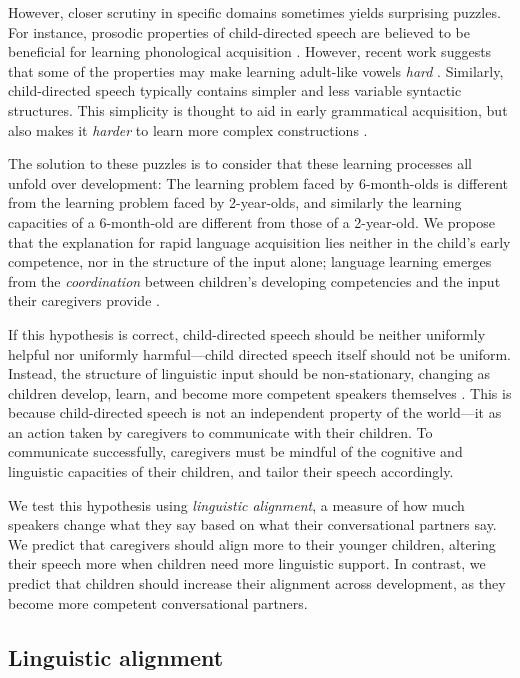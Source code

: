 \documentclass[10pt,letterpaper]{article}
\begin{document}
However, closer scrutiny in specific domains sometimes yields surprising puzzles. For instance, prosodic properties of child-directed speech are believed to be beneficial for learning phonological acquisition \cite{fernald1989, kuhl1997}. However, recent work suggests that some of the properties may make learning adult-like vowels \emph{hard} \cite{mcmurray2013}. Similarly, child-directed speech typically contains simpler and less variable syntactic structures. This simplicity is thought to aid in early grammatical acquisition, but also makes it \emph{harder} to learn more complex constructions \cite{montag2015a, montag2015b}.

The solution to these puzzles is to consider that these learning processes all unfold over development: The learning problem faced by 6-month-olds is different from the learning problem faced by 2-year-olds, and similarly the learning capacities of a 6-month-old are different from those of a 2-year-old. We propose that the explanation for rapid language acquisition lies neither in the child's early competence, nor in the structure of the input alone; language learning emerges from the  \emph{coordination} between children's developing competencies and the input their caregivers provide \cite{vygotsky1978}. 

If this hypothesis is correct, child-directed speech should be neither uniformly helpful nor uniformly harmful---child directed speech itself should not be uniform. Instead, the structure of linguistic input should be non-stationary, changing as children develop, learn, and become more competent speakers themselves \cite{elman1993, fausey2016}. This is because child-directed speech is not an independent property of the world---it as an action taken by caregivers to communicate with their children. To communicate successfully, caregivers must be mindful of the cognitive and linguistic capacities of their children, and tailor their speech accordingly. 

We test this hypothesis using \emph{linguistic alignment}, a measure of how much speakers change what they say based on what their conversational partners say. We predict that caregivers should align more to their younger children, altering their speech more when children need more linguistic support. In contrast, we predict that children should increase their alignment across development, as they become more competent conversational partners.

\subsection{Linguistic alignment}
\end{document}
